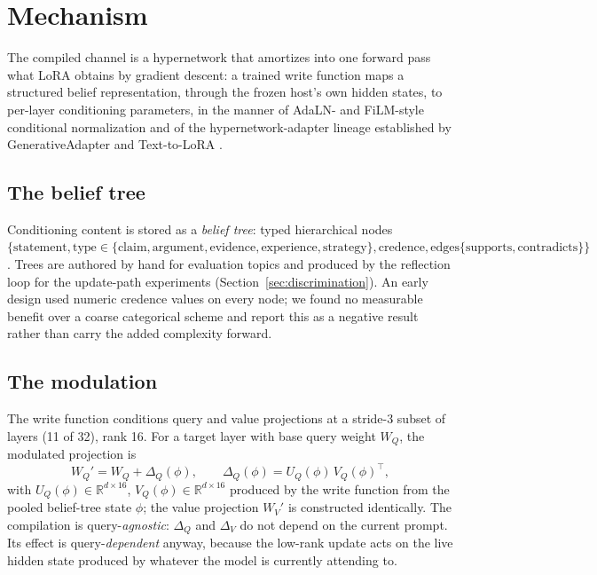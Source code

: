 \section{Mechanism}
\label{sec:mechanism}

The compiled channel is a hypernetwork that amortizes into one forward pass what LoRA
obtains by gradient descent: a trained write function maps a structured belief
representation, through the frozen host's own hidden states, to per-layer conditioning
parameters, in the manner of AdaLN- and FiLM-style conditional normalization
\citep{perez1970film,xu2019adain} and of the hypernetwork-adapter lineage established by
GenerativeAdapter \citep{chen2025generativeadapter} and Text-to-LoRA
\citep{charakorn2025texttolora}.

\subsection{The belief tree}
\label{sec:mechanism-belieftree}

Conditioning content is stored as a \emph{belief tree}: typed hierarchical nodes
\(\{\text{statement}, \text{type} \in \{\text{claim}, \text{argument}, \text{evidence},
\text{experience}, \text{strategy}\}, \text{credence}, \text{edges}
\{\text{supports}, \text{contradicts}\}\}\). Trees are authored by hand for evaluation
topics and produced by the reflection loop for the update-path experiments
(Section~\ref{sec:discrimination}). An early design used numeric credence values on
every node; we found no measurable benefit over a coarse categorical scheme and report
this as a negative result rather than carry the added complexity forward.

\subsection{The modulation}
\label{sec:mechanism-modulation}

The write function conditions query and value projections at a stride-3 subset of
layers (11 of 32), rank 16. For a target layer with base query weight \(W_Q\), the
modulated projection is
\[
  W_Q' = W_Q + \Delta_Q(\phi), \qquad \Delta_Q(\phi) = U_Q(\phi)\,V_Q(\phi)^\top,
\]
with \(U_Q(\phi) \in \mathbb{R}^{d \times 16}\), \(V_Q(\phi) \in \mathbb{R}^{d \times
16}\) produced by the write function from the pooled belief-tree state \(\phi\); the
value projection \(W_V'\) is constructed identically. The compilation is
query-\emph{agnostic}: \(\Delta_Q\) and \(\Delta_V\) do not depend on the current
prompt. Its effect is query-\emph{dependent} anyway, because the low-rank update acts
on the live hidden state produced by whatever the model is currently attending to.

